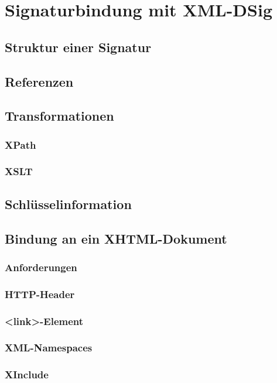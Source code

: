 
\chapter{Signaturbindung mit XML-DSig}
%
\label{chp:Signaturbindung}

\section{Struktur einer Signatur}

\section{Referenzen}
%
\label{sec:Signaturbindung:Referenzen}

\section{Transformationen}
%
\label{sec:Signaturbindung:Transformationen}

\subsection{XPath}
\label{sec:Signaturbindung:Transformationen:XPath}

\subsection{XSLT}
\label{sec:Signaturbindung:Transformationen:XSLT}

\section{Schlüsselinformation}

\section{Bindung an ein XHTML-Dokument}

\subsection{Anforderungen}

\subsection{HTTP-Header}

\subsection{<link>-Element}

\subsection{XML-Namespaces}

\subsection{XInclude}
